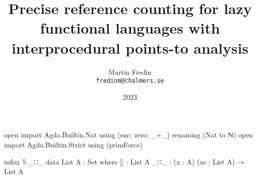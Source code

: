 \documentclass[10pt, twocolumn]{article}
\title{Precise reference counting for lazy functional languages with interprocedural points-to analysis}
\author{Martin Fredin \\ \texttt{fredinm@chalmers.se}}
\date{2023}
\begin{document}
\maketitle


\begin{code}[hide]
open import Agda.Builtin.Nat using (suc; zero; _+_) renaming (Nat to ℕ) 
open import Agda.Builtin.Strict using (primForce)

infixr 5 _∷_
data List A : Set where
  []  : List A
  _∷_ : (x : A) (xs : List A) → List A
\end{code}


%
%
%
%
\end{document}
